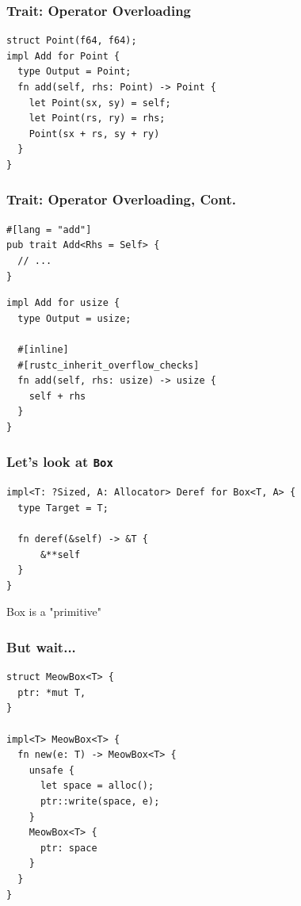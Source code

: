 \documentclass[UTF-8]{ctexbeamer}
\begin{document}
\begin{frame}[fragile]
  \frametitle{Trait: Operator Overloading}

  \pause

  \begin{verbatim}
struct Point(f64, f64);
impl Add for Point {
  type Output = Point;
  fn add(self, rhs: Point) -> Point {
    let Point(sx, sy) = self;
    let Point(rs, ry) = rhs;
    Point(sx + rs, sy + ry)
  }
}
  \end{verbatim}
\end{frame}

\begin{frame}[fragile]
  \frametitle{Trait: Operator Overloading, Cont.}
  \begin{verbatim}
#[lang = "add"]
pub trait Add<Rhs = Self> {
  // ...
}
  \end{verbatim}
  \pause

  \begin{verbatim}
impl Add for usize {
  type Output = usize;

  #[inline]
  #[rustc_inherit_overflow_checks]
  fn add(self, rhs: usize) -> usize {
    self + rhs
  }
}
  \end{verbatim}
\end{frame}

\begin{frame}[fragile]
  \frametitle{Let's look at \texttt{Box}}

  \begin{verbatim}
impl<T: ?Sized, A: Allocator> Deref for Box<T, A> {
  type Target = T;

  fn deref(&self) -> &T {
      &**self
  }
}
  \end{verbatim}

  \pause
  \vspace{1em}

  Box is a "primitive"
\end{frame}

\begin{frame}[fragile]
  \frametitle{But wait...}

  \begin{verbatim}
struct MeowBox<T> {
  ptr: *mut T,
}

impl<T> MeowBox<T> {
  fn new(e: T) -> MeowBox<T> {
    unsafe {
      let space = alloc();
      ptr::write(space, e);
    }
    MeowBox<T> {
      ptr: space
    }
  }
}
  \end{verbatim}
\end{frame}
\end{document}
